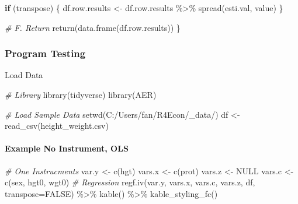 \documentclass[
]{book}
\newenvironment{Shaded}{\begin{snugshade}}{\end{snugshade}}
\newcommand{\AttributeTok}[1]{\textcolor[rgb]{0.77,0.63,0.00}{#1}}
\newcommand{\CommentTok}[1]{\textcolor[rgb]{0.56,0.35,0.01}{\textit{#1}}}
\newcommand{\ConstantTok}[1]{\textcolor[rgb]{0.00,0.00,0.00}{#1}}
\newcommand{\ControlFlowTok}[1]{\textcolor[rgb]{0.13,0.29,0.53}{\textbf{#1}}}
\newcommand{\FunctionTok}[1]{\textcolor[rgb]{0.00,0.00,0.00}{#1}}
\newcommand{\NormalTok}[1]{#1}
\newcommand{\OtherTok}[1]{\textcolor[rgb]{0.56,0.35,0.01}{#1}}
\newcommand{\SpecialCharTok}[1]{\textcolor[rgb]{0.00,0.00,0.00}{#1}}
\newcommand{\StringTok}[1]{\textcolor[rgb]{0.31,0.60,0.02}{#1}}
\begin{document}
\begin{Shaded}
\begin{Highlighting}[]
  \ControlFlowTok{if}\NormalTok{ (transpose) \{}
\NormalTok{    df.row.results }\OtherTok{\textless{}{-}}\NormalTok{ df.row.results }\SpecialCharTok{\%\textgreater{}\%} \FunctionTok{spread}\NormalTok{(esti.val, value)}
\NormalTok{  \}}
  
  \CommentTok{\# F. Return}
  \FunctionTok{return}\NormalTok{(}\FunctionTok{data.frame}\NormalTok{(df.row.results))}
\NormalTok{\}}
\end{Highlighting}
\end{Shaded}

\hypertarget{program-testing}{%
\subsubsection{Program Testing}\label{program-testing}}

Load Data

\begin{Shaded}
\begin{Highlighting}[]
\CommentTok{\# Library}
\FunctionTok{library}\NormalTok{(tidyverse)}
\FunctionTok{library}\NormalTok{(AER)}

\CommentTok{\# Load Sample Data}
\FunctionTok{setwd}\NormalTok{(}\StringTok{\textquotesingle{}C:/Users/fan/R4Econ/\_data/\textquotesingle{}}\NormalTok{)}
\NormalTok{df }\OtherTok{\textless{}{-}} \FunctionTok{read\_csv}\NormalTok{(}\StringTok{\textquotesingle{}height\_weight.csv\textquotesingle{}}\NormalTok{)}
\end{Highlighting}
\end{Shaded}

\hypertarget{example-no-instrument-ols}{%
\paragraph{Example No Instrument, OLS}\label{example-no-instrument-ols}}

\begin{Shaded}
\begin{Highlighting}[]
\CommentTok{\# One Instrucments}
\NormalTok{var.y }\OtherTok{\textless{}{-}} \FunctionTok{c}\NormalTok{(}\StringTok{\textquotesingle{}hgt\textquotesingle{}}\NormalTok{)}
\NormalTok{vars.x }\OtherTok{\textless{}{-}} \FunctionTok{c}\NormalTok{(}\StringTok{\textquotesingle{}prot\textquotesingle{}}\NormalTok{)}
\NormalTok{vars.z }\OtherTok{\textless{}{-}} \ConstantTok{NULL}
\NormalTok{vars.c }\OtherTok{\textless{}{-}} \FunctionTok{c}\NormalTok{(}\StringTok{\textquotesingle{}sex\textquotesingle{}}\NormalTok{, }\StringTok{\textquotesingle{}hgt0\textquotesingle{}}\NormalTok{, }\StringTok{\textquotesingle{}wgt0\textquotesingle{}}\NormalTok{)}
\CommentTok{\# Regression}
\FunctionTok{regf.iv}\NormalTok{(var.y, vars.x, vars.c, vars.z, df, }\AttributeTok{transpose=}\ConstantTok{FALSE}\NormalTok{) }\SpecialCharTok{\%\textgreater{}\%}
  \FunctionTok{kable}\NormalTok{() }\SpecialCharTok{\%\textgreater{}\%}
  \FunctionTok{kable\_styling\_fc}\NormalTok{()}
\end{Highlighting}
\end{Shaded}
\end{document}
